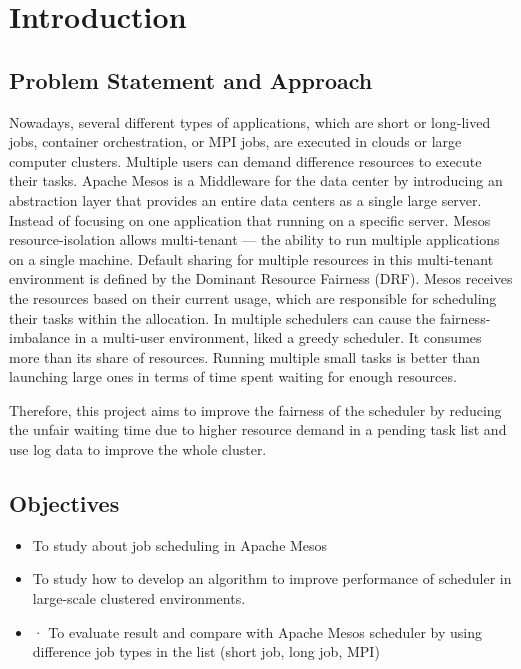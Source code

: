 \documentclass[12pt,oneside,openright,a4paper]{cpe-english-project}
\begin{document}



\chapter{Introduction}

\section{Problem Statement and Approach} 

\hspace{10mm}Nowadays, several different types of applications, which are short or long-lived jobs, container orchestration, or MPI jobs, are executed in clouds or large computer clusters. Multiple users can demand difference resources to execute their tasks. Apache Mesos is a Middleware for the data center by introducing an abstraction layer that provides an entire data centers as a single large server. Instead of focusing on one application that running on a specific server. Mesos resource-isolation allows multi-tenant — the ability to run multiple applications on a single machine. Default sharing for multiple resources in this multi-tenant environment is defined by the Dominant Resource Fairness (DRF). Mesos receives the resources based on their current usage, which are responsible for scheduling their tasks within the allocation. In multiple schedulers can cause the fairness-imbalance in a multi-user environment, liked a greedy scheduler. It consumes more than its share of resources. Running multiple small tasks is better than launching large ones in terms of time spent waiting for enough resources. 

\hspace{10mm}Therefore, this project aims to improve the fairness of the scheduler by reducing the unfair waiting time due to higher resource demand in a pending task list and use log data to improve the whole cluster.


\section{Objectives}
\begin{itemize}
  \item  To study about job scheduling in Apache Mesos
  \item  To study how to develop an algorithm to improve performance of scheduler in large-scale clustered environments.
  \item  ·	To evaluate result and compare with Apache Mesos scheduler by using difference job types in the list (short job, long job, MPI)
\end{itemize}
\end{document}
